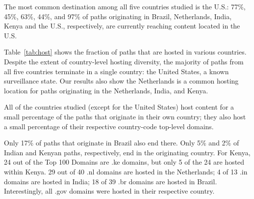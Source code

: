 \begin{finding}
The most common destination among all five countries studied is the U.S.: 77\%, 45\%, 63\%, 44\%, and 97\% of paths originating in Brazil, Netherlands, India, Kenya and the U.S., respectively, are currently reaching content located in the U.S.
\end{finding}
\noindent
Table~\ref{tab:host} shows the fraction of paths that are hosted in
various countries.  Despite the extent of country-level hosting
diversity, the majority of paths from all five countries terminate in a
single country: the United States, a known surveillance state.   Our results also show the Netherlands is a
common hosting location for paths originating in the Netherlands, India,
and Kenya.



\begin{finding}
All of the countries studied (except for the United States) host content for a small percentage of the paths that originate in their own country; they also host a small percentage of their respective country-code top-level domains.
\end{finding}
\noindent
Only 17\% of paths that originate in Brazil also end there.  Only 5\%
and 2\% of Indian and Kenyan paths, respectively, end in the originating
country.  
For Kenya, 24 out of the Top 100 Domains are .ke domains, but only 5
of the 24 are hosted within Kenya.  29 out of 40 .nl domains are hosted in the Netherlands; 4 of 13 .in domains are hosted in India; 18 of 39 .br domains are hosted in Brazil.  Interestingly, all .gov domains were hosted in their respective country. 

